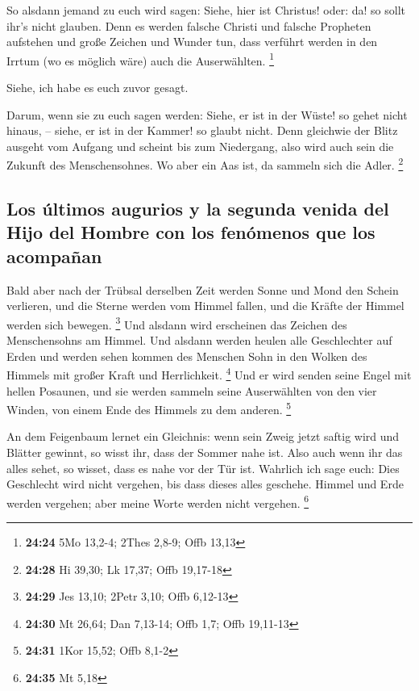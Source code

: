  So alsdann jemand zu euch wird sagen: Siehe, hier ist
Christus! oder: da! so sollt ihr's nicht glauben.  Denn
es werden falsche Christi und falsche Propheten aufstehen und große
Zeichen und Wunder tun, dass verführt werden in den Irrtum (wo es
möglich wäre) auch die Auserwählten. \footnote{\textbf{24:24} 5Mo
  13,2-4; 2Thes 2,8-9; Offb 13,13}

 Siehe, ich habe es euch zuvor gesagt.

 Darum, wenn sie zu euch sagen werden: Siehe, er ist in
der Wüste! so gehet nicht hinaus, -- siehe, er ist in der Kammer! so
glaubt nicht.  Denn gleichwie der Blitz ausgeht vom
Aufgang und scheint bis zum Niedergang, also wird auch sein die Zukunft
des Menschensohnes.  Wo aber ein Aas ist, da sammeln sich
die Adler. \footnote{\textbf{24:28} Hi 39,30; Lk 17,37; Offb 19,17-18}

\hypertarget{los-uxfaltimos-augurios-y-la-segunda-venida-del-hijo-del-hombre-con-los-fenuxf3menos-que-los-acompauxf1an}{%
\subsection{Los últimos augurios y la segunda venida del Hijo del Hombre
con los fenómenos que los
acompañan}\label{los-uxfaltimos-augurios-y-la-segunda-venida-del-hijo-del-hombre-con-los-fenuxf3menos-que-los-acompauxf1an}}

 Bald aber nach der Trübsal derselben Zeit werden Sonne
und Mond den Schein verlieren, und die Sterne werden vom Himmel fallen,
und die Kräfte der Himmel werden sich bewegen. \footnote{\textbf{24:29}
  Jes 13,10; 2Petr 3,10; Offb 6,12-13}  Und alsdann wird
erscheinen das Zeichen des Menschensohns am Himmel. Und alsdann werden
heulen alle Geschlechter auf Erden und werden sehen kommen des Menschen
Sohn in den Wolken des Himmels mit großer Kraft und Herrlichkeit.
\footnote{\textbf{24:30} Mt 26,64; Dan 7,13-14; Offb 1,7; Offb 19,11-13}
 Und er wird senden seine Engel mit hellen Posaunen, und
sie werden sammeln seine Auserwählten von den vier Winden, von einem
Ende des Himmels zu dem anderen. \footnote{\textbf{24:31} 1Kor 15,52;
  Offb 8,1-2}

 An dem Feigenbaum lernet ein Gleichnis: wenn sein Zweig
jetzt saftig wird und Blätter gewinnt, so wisst ihr, dass der Sommer
nahe ist.  Also auch wenn ihr das alles sehet, so wisset,
dass es nahe vor der Tür ist.  Wahrlich ich sage euch:
Dies Geschlecht wird nicht vergehen, bis dass dieses alles geschehe.
 Himmel und Erde werden vergehen; aber meine Worte werden
nicht vergehen. \footnote{\textbf{24:35} Mt 5,18}

